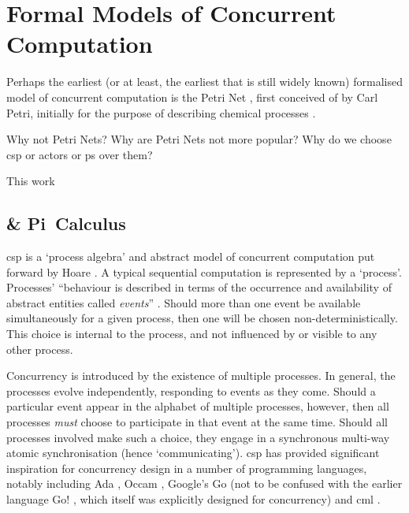\section{Formal Models of Concurrent Computation}
Perhaps the earliest (or at least, the earliest that is still widely known) formalised model of concurrent computation is the Petri Net \cite{Dennis2011}, first conceived of by Carl Petri, initially for the purpose of describing chemical processes \cite{Petri2008}.

\begin{anfxerror}{Why not Petri Nets?}
Why are Petri Nets not more popular?  Why do we choose \gls{csp} or \glspl{actor} or \gls{ps} over them?
\end{anfxerror}

\cite{Varela2013}

This work 

\subsection{ \& Pi~Calculus}
\gls{csp} is a `process algebra' and abstract model of concurrent computation put forward by Hoare \cite{Hoare1985,Roscoe2011}.  A typical sequential computation is represented by a `process'.  Processes' ``behaviour is described in terms of the occurrence and availability of abstract entities called \textit{events}'' \cite[p.~478]{Roscoe2011}.  Should more than one event be available simultaneously for a given process, then one will be chosen non-deterministically.  This choice is internal to the process, and not influenced by or visible to any other process.  %

Concurrency is introduced by the existence of multiple processes.  In general, the processes evolve independently, responding to events as they come.  Should a particular event appear in the alphabet of multiple processes, however, then all processes \emph{must} choose to participate in that event at the same time.  Should all processes involved make such a choice, they engage in a synchronous multi-way atomic synchronisation (hence `communicating').  \gls{csp} has provided significant inspiration for concurrency design in a number of programming languages, notably including Ada \cite{Defense1983,Taft2013}, Occam \cite{Elizabeth1987}, Google's Go \cite{Meyerson2014} (not to be confused with the earlier language Go! \cite{Clark2004}, which itself was explicitly designed for concurrency) and \gls{cml} \cite{Reppy2011}. 

